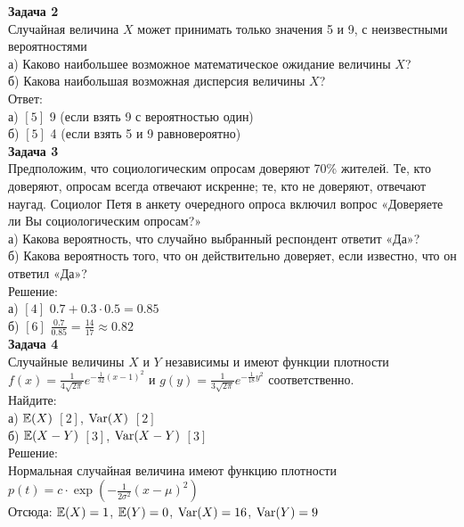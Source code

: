\documentclass[12pt, a4paper]{article}\usepackage[]{graphicx}\usepackage[]{color}
\begin{document}
\textbf{Задача 2} \\ %
Случайная величина $X$ может принимать только значения 5 и 9, с неизвестными вероятностями \\
а) Каково наибольшее возможное математическое ожидание величины $X$? \\
б) Какова наибольшая возможная дисперсия величины $X$? \\
Ответ: \\
а) $[5]$ 9 (если взять 9 с вероятностью один) \\
б) $[5]$ 4 (если взять 5 и 9 равновероятно) \\






\textbf{Задача 3} \\ %
Предположим, что социологическим опросам доверяют 70\% жителей. Те, кто доверяют, опросам всегда отвечают искренне; те, кто не доверяют, отвечают наугад. Социолог Петя  в анкету очередного опроса включил вопрос «Доверяете ли Вы социологическим опросам?» \\
а) Какова вероятность, что случайно выбранный респондент ответит «Да»? \\
б) Какова вероятность того, что он действительно доверяет, если известно, что он ответил «Да»? \\
Решение: \\
а) $[4]$ $0.7+0.3\cdot0.5=0.85$ \\
б) $[6]$ $\frac{0.7}{0.85}=\frac{14}{17}\approx 0.82$ \\


\textbf{Задача 4} \\
Случайные величины $X$ и $Y$ независимы и имеют функции плотности $f(x)=\frac{1}{4\sqrt{2\pi } } e^{-\frac{1}{32} (x-1)^{2} }$ и $g(y)=\frac{1}{3\sqrt{2\pi } } e^{-\frac{1}{18} y^{2} }$ соответственно. \\
Найдите: \\
а) $\mathbb{E}(X)$ $[2]$, $\operatorname{Var}(X)$ $[2]$ \\
б) $\mathbb{E}(X-Y)$ $[3]$, $\operatorname{Var}(X-Y)$ $[3]$ \\
Решение: \\
Нормальная случайная величина имеют функцию плотности $p(t)=c\cdot \exp(-\frac{1}{2\sigma^{2}}(x-\mu)^{2})$ \\
Отсюда: $\mathbb{E}(X)=1$, $\mathbb{E}(Y)=0$, $\operatorname{Var}(X)=16$, $\operatorname{Var}(Y)=9$ \\
\end{document}
